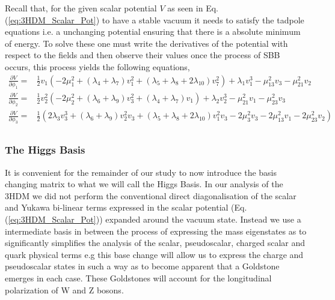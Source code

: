 Recall that, for the given scalar potential $V$ as seen in Eq.\,(\ref{eq:3HDM_Scalar_Pot}) to have a stable vacuum it needs to satisfy the tadpole equations i.e. a unchanging potential ensuring that there is a absolute minimum of energy. 
%
To solve these one must write the derivatives of the potential with respect to the fields and then observe their values once the process of SBB occurs, this process yields the following equations,
%
\begin{equation}
\label{eq:3HDM_tadpoles}
\begin{split}
\frac{\partial V}{\partial \phi_1} = & \frac{1}{2} v_1 \left(-2 \mu _1^2+\left(\lambda _4+\lambda _7\right) v_1^2+\left(\lambda _5+\lambda _8+2 \lambda _{10}\right) v_7^2\right)+\lambda _1 v_1^3-\mu _{13}^2 v_3-\mu _{21}^2 v_2 \\ 
\frac{\partial V}{\partial \phi_2} = & \frac{1}{2} v_2^2 \left(-2 \mu _2^2+\left(\lambda _6+\lambda _9\right) v_3^2+\left(\lambda _4+\lambda _7\right) v_1\right)+\lambda _2 v_2^3-\mu _{21}^2 v_1-\mu _{23}^2 v_3 \\
\frac{\partial V}{\partial \phi_3} = & \frac{1}{2} \left(2 \lambda _3 v_3^3+\left(\lambda _6+\lambda _9\right) v_2^2 v_3+\left(\lambda _5+\lambda _8+2 \lambda _{10}\right) v_1^2 v_3-2 \mu _3^2 v_3-2 \mu _{13}^2 v_1-2 \mu _{23}^2 v_2\right) \\
\end{split} 
\end{equation}

\subsubsection{The Higgs Basis}

It is convenient for the remainder of our study to now introduce the basis changing matrix to what we will call the Higgs Basis.
%
In our analysis of the 3HDM we did not perform the conventional direct diagonalisation of the scalar and Yukawa bi-linear terms expressed in the scalar potential (Eq.\,(\ref{eq:3HDM_Scalar_Pot})) expanded around the vacuum state.
%
Instead we use a intermediate basis in between the process of expressing the mass eigenstates as to significantly simplifies the analysis of the scalar, pseudoscalar, charged scalar and quark physical terms 
%
%
e.g this base change will allow us to express the charge and pseudoscalar states in such a way as to become apparent that a Goldstone emerges in each case. 
%
These Goldstones will account for the longitudinal polarization of W and Z bosons. 

